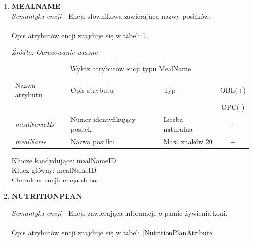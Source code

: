 \documentclass[12pt,twoside]{report}
\begin{document}
\begin{enumerate}[start=10,label={\bfseries ENC$\backslash$\arabic*}]
	\item \textbf{MEALNAME} \\
	\textit{Semantyka encji} - Encja słownikowa zawierająca nazwy posiłków.
		\\ \\
Opis atrybutów encji znajduje się w tabeli \ref{MealNameAtribute}.
	
	\begin{table}[H]
		\caption{Wykaz atrybutów encji typu MealName }
		\textit{Źródło: Opracowanie własne}
		\label{MealNameAtribute}
		\centering
		\begin{tabular}{|l|l|l|c|}
			\hline
			Nazwa atrybutu & Opis atrybutu & Typ & OBL(+) \\
			& & &  OPC(-) \\
			\hline
			\textit{mealNameID} & Numer identyfikujący posiłek & Liczba naturalna & + \\
			\hline
			\textit{mealName} & Nazwa posiłku & Max. znaków 20 & + \\
			\hline
		\end{tabular}
	\end{table}
	Klucze kandydujące: mealNameID \\
	Klucz główny: mealNameID \\
	Charakter encji: encja słaba \\

\item \textbf{NUTRITIONPLAN}

\textit{Semantyka encji} - Encja zawierająca informacje o planie żywienia koni.
		\\ \\
Opis atrybutów encji znajduje się w tabeli \ref{NutritionPlanAtribute}.


\end{enumerate}
\end{document}

